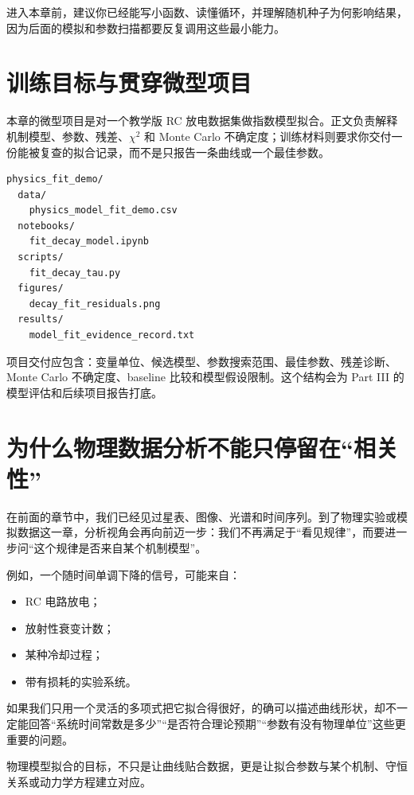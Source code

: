 进入本章前，建议你已经能写小函数、读懂循环，并理解随机种子为何影响结果，因为后面的模拟和参数扫描都要反复调用这些最小能力。

\section{训练目标与贯穿微型项目}

本章的微型项目是对一个教学版 RC 放电数据集做指数模型拟合。正文负责解释机制模型、参数、残差、\(\chi^2\) 和 Monte Carlo 不确定度；训练材料则要求你交付一份能被复查的拟合记录，而不是只报告一条曲线或一个最佳参数。

\begin{examplebox}[最小物理拟合项目结构]
\begin{lstlisting}[style=terminal]
physics_fit_demo/
  data/
    physics_model_fit_demo.csv
  notebooks/
    fit_decay_model.ipynb
  scripts/
    fit_decay_tau.py
  figures/
    decay_fit_residuals.png
  results/
    model_fit_evidence_record.txt
\end{lstlisting}
\end{examplebox}

项目交付应包含：变量单位、候选模型、参数搜索范围、最佳参数、残差诊断、Monte Carlo 不确定度、baseline 比较和模型假设限制。这个结构会为 Part III 的模型评估和后续项目报告打底。

\section{为什么物理数据分析不能只停留在“相关性”}

在前面的章节中，我们已经见过星表、图像、光谱和时间序列。到了物理实验或模拟数据这一章，分析视角会再向前迈一步：我们不再满足于“看见规律”，而要进一步问“这个规律是否来自某个机制模型”。

例如，一个随时间单调下降的信号，可能来自：

\begin{itemize}
    \item RC 电路放电；
    \item 放射性衰变计数；
    \item 某种冷却过程；
    \item 带有损耗的实验系统。
\end{itemize}

如果我们只用一个灵活的多项式把它拟合得很好，的确可以描述曲线形状，却不一定能回答“系统时间常数是多少”“是否符合理论预期”“参数有没有物理单位”这些更重要的问题。

\begin{defbox}[物理模型拟合]
物理模型拟合的目标，不只是让曲线贴合数据，更是让拟合参数与某个机制、守恒关系或动力学方程建立对应。
\end{defbox}

